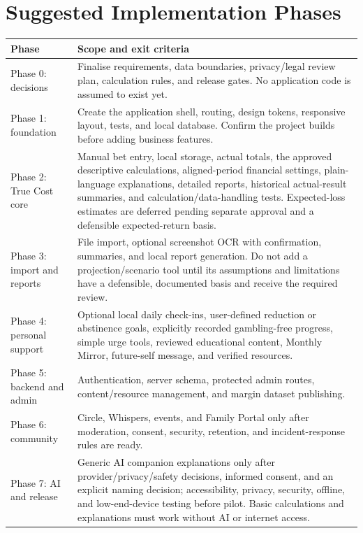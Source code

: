 \documentclass[11pt,a4paper]{article}
\begin{document}
\section{Suggested Implementation Phases}

\begin{longtable}{p{}p{}}
\toprule
\textbf{Phase} & \textbf{Scope and exit criteria} \\
\midrule
Phase 0: decisions & Finalise requirements, data boundaries, privacy/legal review plan, calculation rules, and release gates. No application code is assumed to exist yet. \\
Phase 1: foundation & Create the application shell, routing, design tokens, responsive layout, tests, and local database. Confirm the project builds before adding business features. \\
Phase 2: True Cost core & Manual bet entry, local storage, actual totals, the approved descriptive calculations, aligned-period financial settings, plain-language explanations, detailed reports, historical actual-result summaries, and calculation/data-handling tests. Expected-loss estimates are deferred pending separate approval and a defensible expected-return basis. \\
Phase 3: import and reports & File import, optional screenshot OCR with confirmation, summaries, and local report generation. Do not add a projection/scenario tool until its assumptions and limitations have a defensible, documented basis and receive the required review. \\
Phase 4: personal support & Optional local daily check-ins, user-defined reduction or abstinence goals, explicitly recorded gambling-free progress, simple urge tools, reviewed educational content, Monthly Mirror, future-self message, and verified resources. \\
Phase 5: backend and admin & Authentication, server schema, protected admin routes, content/resource management, and margin dataset publishing. \\
Phase 6: community & Circle, Whispers, events, and Family Portal only after moderation, consent, security, retention, and incident-response rules are ready. \\
Phase 7: AI and release & Generic AI companion explanations only after provider/privacy/safety decisions, informed consent, and an explicit naming decision; accessibility, privacy, security, offline, and low-end-device testing before pilot. Basic calculations and explanations must work without AI or internet access. \\
\bottomrule
\end{longtable}
\end{document}
